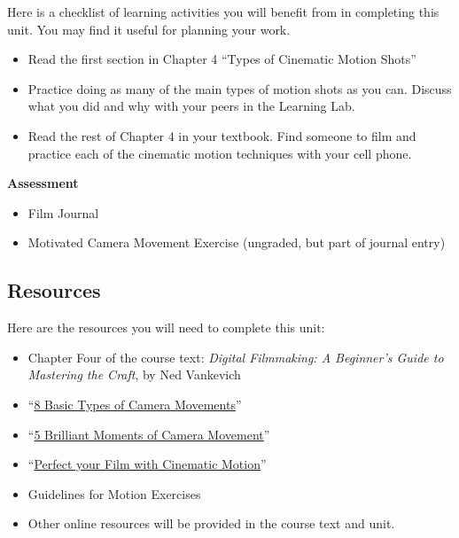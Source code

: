\documentclass[
]{book}
\providecommand{\tightlist}{%
  \setlength{\itemsep}{0pt}\setlength{\parskip}{0pt}}
\begin{document}
\begin{reflect}
Here is a checklist of learning activities you will benefit from in completing this unit. You may find it useful for planning your work.

\begin{itemize}
\tightlist
\item
  Read the first section in Chapter 4 ``Types of Cinematic Motion Shots''\\
\item
  Practice doing as many of the main types of motion shots as you can. Discuss what you did and why with your peers in the Learning Lab.\\
\item
  Read the rest of Chapter 4 in your textbook. Find someone to film and practice each of the cinematic motion techniques with your cell phone.
\end{itemize}

\textbf{Assessment}

\begin{itemize}
\tightlist
\item
  Film Journal\\
\item
  Motivated Camera Movement Exercise (ungraded, but part of journal entry)
\end{itemize}
\end{reflect}

\hypertarget{resources-3}{%
\subsection*{Resources}\label{resources-3}}

Here are the resources you will need to complete this unit:

\begin{itemize}
\tightlist
\item
  Chapter Four of the course text: \emph{Digital Filmmaking: A Beginner's Guide to Mastering the Craft}, by Ned Vankevich
\item
  ``\href{https://www.youtube.com/watch?v=g6zMtnLC50w}{8 Basic Types of Camera Movements}''\\
\item
  ``\href{https://www.youtube.com/watch?v=h2c3JZ6X3f8}{5 Brilliant Moments of Camera Movement}''\\
\item
  ``\href{https://www.youtube.com/watch?v=VPfKsdPsS5w}{Perfect your Film with Cinematic Motion}''\\
\item
  Guidelines for Motion Exercises\\
\item
  Other online resources will be provided in the course text and unit.
\end{itemize}
\end{document}
